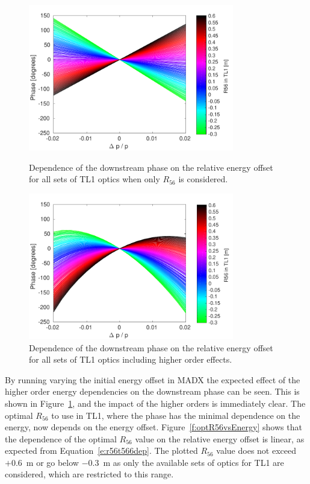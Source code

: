 \begin{figure}
  \centering
  \includegraphics[width=0.8\textwidth]{Figures/propagation/phaseVsEn_r56Only}
  \caption{Dependence of the downstream phase on the relative energy offset for all sets of TL1 optics when only \(R_{56}\) is considered.}
  \label{f:phaseVsEn_r56Only}  
  \centering
  \includegraphics[width=0.8\textwidth]{Figures/propagation/phaseVsEn_t566}
  \caption{Dependence of the downstream phase on the relative energy offset for all sets of TL1 optics including higher order effects.}
  \label{f:phaseVsEn_t566}
\end{figure}

By running varying the initial energy offset in MADX the expected effect of the higher order energy dependencies on the downstream phase can be seen. This is shown in Figure~\ref{f:phaseVsEn_t566}, and the impact of the higher orders is immediately clear. The optimal \(R_{56}\) to use in TL1, where the phase has the minimal dependence on the energy, now depends on the energy offset. Figure~\ref{f:optR56vsEnergy} shows that the dependence of the optimal \(R_{56}\) value on the relative energy offset is linear, as expected from Equation~\ref{e:r56t566dep}. The plotted \(R_{56}\) value does not exceed \(+0.6\)~m or go below \(-0.3\)~m as only the available sets of optics for TL1 are considered, which are restricted to this range. %


